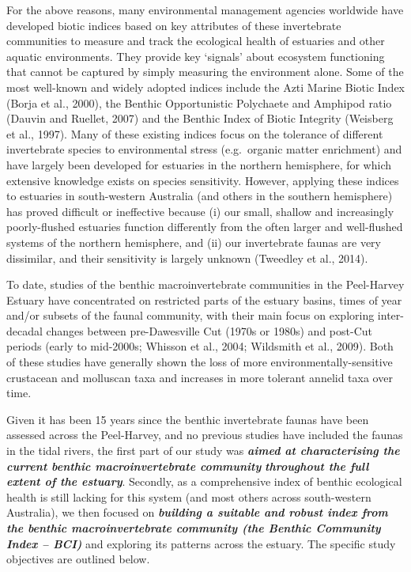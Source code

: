 \documentclass[
]{book}
\begin{document}
For the above reasons, many environmental management agencies worldwide have developed biotic indices based on key attributes of these invertebrate communities to measure and track the ecological health of estuaries and other aquatic environments. They provide key `signals' about ecosystem functioning that cannot be captured by simply measuring the environment alone. Some of the most well-known and widely adopted indices include the Azti Marine Biotic Index (Borja et al., 2000), the Benthic Opportunistic Polychaete and Amphipod ratio (Dauvin and Ruellet, 2007) and the Benthic Index of Biotic Integrity (Weisberg et al., 1997). Many of these existing indices focus on the tolerance of different invertebrate species to environmental stress (e.g.~organic matter enrichment) and have largely been developed for estuaries in the northern hemisphere, for which extensive knowledge exists on species sensitivity. However, applying these indices to estuaries in south-western Australia (and others in the southern hemisphere) has proved difficult or ineffective because (i) our small, shallow and increasingly poorly-flushed estuaries function differently from the often larger and well-flushed systems of the northern hemisphere, and (ii) our invertebrate faunas are very dissimilar, and their sensitivity is largely unknown (Tweedley et al., 2014).

To date, studies of the benthic macroinvertebrate communities in the Peel-Harvey Estuary have concentrated on restricted parts of the estuary basins, times of year and/or subsets of the faunal community, with their main focus on exploring inter-decadal changes between pre-Dawesville Cut (1970s or 1980s) and post-Cut periods (early to mid-2000s; Whisson et al., 2004; Wildsmith et al., 2009). Both of these studies have generally shown the loss of more environmentally-sensitive crustacean and molluscan taxa and increases in more tolerant annelid taxa over time.

Given it has been 15 years since the benthic invertebrate faunas have been assessed across the Peel-Harvey, and no previous studies have included the faunas in the tidal rivers, the first part of our study was \textbf{\emph{aimed at characterising the current benthic macroinvertebrate community}} \textbf{\emph{throughout the full extent of the estuary}}. Secondly, as a comprehensive index of benthic ecological health is still lacking for this system (and most others across south-western Australia), we then focused on \textbf{\emph{building a suitable and robust index from the benthic macroinvertebrate community (the Benthic Community Index -- BCI)}} and exploring its patterns across the estuary. The specific study objectives are outlined below.
\end{document}
